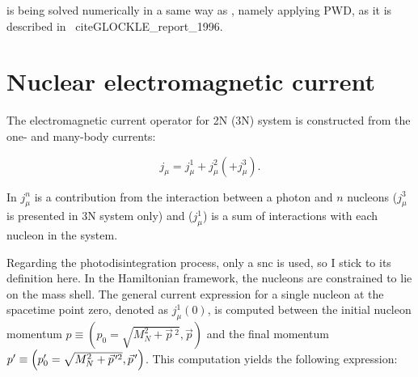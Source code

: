      is being solved numerically in a same way as , namely applying
    PWD, as it is described in \, cite{GLOCKLE_report_1996}.


    \section{Nuclear electromagnetic current}
    \label{sec_current}
    

    The electromagnetic current operator for 2N (3N) system is constructed 
    from the one- and many-body currents:
    
    \begin{equation}
        j_\mu = j_\mu^1 + j_\mu^2 (+ j_\mu^3).
        \label{j_mu_gen}
    \end{equation}

    In  $j_\mu^n$ is a contribution from the interaction between a photon and 
    $n$ nucleons ($j_\mu^3$ is presented in 3N system only)
    and ($j_\mu^1$) is a sum of interactions with each nucleon in the system. 



    Regarding the photodisintegration process, only a \gls{snc} is used, so I stick to its definition here.
    In the Hamiltonian framework, the nucleons are constrained to lie on the mass shell.
    The general current expression for a
    single nucleon at the spacetime point zero, denoted as $j^1_\mu(0)$, is computed between the initial nucleon momentum
    $p \equiv\left(p_0=\sqrt{M_N^2+\vec{p}\,^2}, \vec{p}\right)$
    and the final momentum
    $p^{\prime} \equiv\left(p_0^{\prime}=\sqrt{M_N^2+\pvec{p}^{2}}, \pvec{p}\right)$. This computation yields the following expression:

